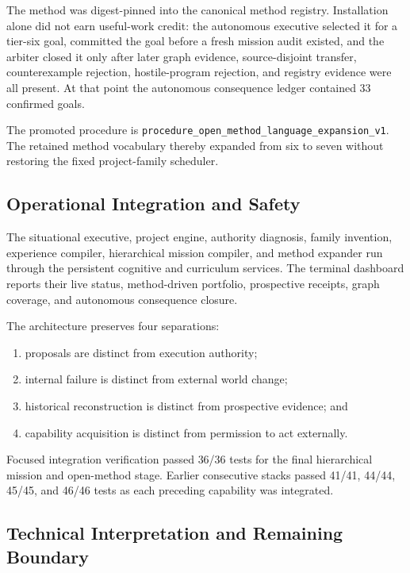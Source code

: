 The method was digest-pinned into the canonical method registry.  Installation
alone did not earn useful-work credit: the autonomous executive selected it for
a tier-six goal, committed the goal before a fresh mission audit existed, and
the arbiter closed it only after later graph evidence, source-disjoint transfer,
counterexample rejection, hostile-program rejection, and registry evidence were
all present.  At that point the autonomous consequence ledger contained 33
confirmed goals.

The promoted procedure is
\texttt{procedure\_open\_method\_language\_expansion\_v1}.  The retained method
vocabulary thereby expanded from six to seven without restoring the fixed
project-family scheduler.

\subsection{Operational Integration and Safety}
\label{subsec:situated-compounding-integration}

The situational executive, project engine, authority diagnosis, family
invention, experience compiler, hierarchical mission compiler, and method
expander run through the persistent cognitive and curriculum services.  The
terminal dashboard reports their live status, method-driven portfolio,
prospective receipts, graph coverage, and autonomous consequence closure.

The architecture preserves four separations:
\begin{enumerate}
    \item proposals are distinct from execution authority;
    \item internal failure is distinct from external world change;
    \item historical reconstruction is distinct from prospective evidence; and
    \item capability acquisition is distinct from permission to act externally.
\end{enumerate}
Focused integration verification passed 36/36 tests for the final hierarchical
mission and open-method stage.  Earlier consecutive stacks passed 41/41,
44/44, 45/45, and 46/46 tests as each preceding capability was integrated.

\subsection{Technical Interpretation and Remaining Boundary}
\label{subsec:situated-compounding-boundary}

